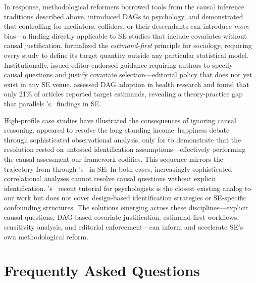 In response, methodological reformers borrowed tools from the causal inference traditions described above.
\citet{rohrer2018thinking} introduced DAGs to psychology, and \citet{wysocki2022statistical} demonstrated that controlling for mediators, colliders, or their descendants can introduce \emph{more} bias---a finding directly applicable to SE studies that include covariates without causal justification.
\citet{lundberg2021estimand} formalized the \emph{estimand-first} principle for sociology, requiring every study to define its target quantity outside any particular statistical model.
Institutionally, \citet{lederer2019control} issued editor-endorsed guidance requiring authors to specify causal questions and justify covariate selection---editorial policy that does not yet exist in any SE venue.
\citet{tennant2021dags} assessed DAG adoption in health research and found that only 21\% of articles reported target estimands, revealing a theory-practice gap that parallels \citeauthor{DBLP:journals/infsof/Siebert23}'s~\cite{DBLP:journals/infsof/Siebert23} findings in SE\@.

High-profile case studies have illustrated the consequences of ignoring causal reasoning.
\citet{killingsworth2023income} appeared to resolve the long-standing income--happiness debate through sophisticated observational analysis, only for \citet{rohrer2024inappropriate} to demonstrate that the resolution rested on untested identification assumptions---effectively performing the causal assessment our framework codifies.
This sequence mirrors the trajectory from \citet{DBLP:conf/sigsoft/RayPFD14} through \citeauthor{DBLP:journals/toplas/BergerHMVV19}'s~\cite{DBLP:journals/toplas/BergerHMVV19} in SE: In both cases, increasingly sophisticated correlational analyses cannot resolve causal questions without explicit identification.
\citeauthor{rohrer2024causal}'s~\cite{rohrer2024causal} recent tutorial for psychologists is the closest existing analog to our work but does not cover design-based identification strategies or SE-specific confounding structures.
The solutions emerging across these disciplines---explicit causal questions, DAG-based covariate justification, estimand-first workflows, sensitivity analysis, and editorial enforcement---can inform and accelerate SE's own methodological reform.


\section{Frequently Asked Questions}
\label{sec:appendix-faq}

